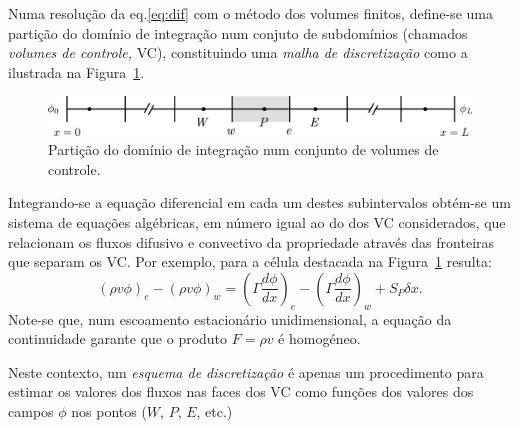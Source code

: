 \documentclass[11pt,twoside]{article}
\begin{document}
{Numa resolução da eq.\eqref{eq:dif} com o método dos volumes finitos, define-se
uma partição do domínio de integração num conjuto de subdomínios (chamados
\emph{volumes de controle,} VC), constituindo uma \emph{malha de discretização}
como a ilustrada na Figura~\ref{fig:1}.
\begin{figure}[!h]
    \begin{center}
        \includegraphics{figs/f10.png}
    \end{center}
    \caption{Partição do domínio de integração num conjunto de volumes de
    controle.\label{fig:1}}
\end{figure}
Integrando-se a equação diferencial em cada um destes subintervalos obtém-se um
sistema de equações algébricas, em número igual ao do dos VC considerados, que
relacionam os fluxos difusivo e convectivo da propriedade através das fronteiras
que separam os VC.  Por exemplo, para a célula destacada na Figura~\ref{fig:1}
resulta:
\begin{equation}
    (\rho v\phi)_e- (\rho v\phi)_w =
    \left(\Gamma \frac{d\phi}{dx}\right)_e-
    \left(\Gamma \frac{d\phi}{dx}\right)_w+S_P\delta x.\label{eq:1}
\end{equation}
Note-se que, num escoamento estacionário unidimensional, a equação da
continuidade garante que o produto $F=\rho v$ é homogéneo.

Neste contexto, um \emph{esquema de discretização} é apenas um procedimento para
estimar os valores dos fluxos nas faces dos VC como funções dos valores dos
campos $\phi$ nos pontos ($W$, $P$, $E$, etc.)

}
\end{document}
